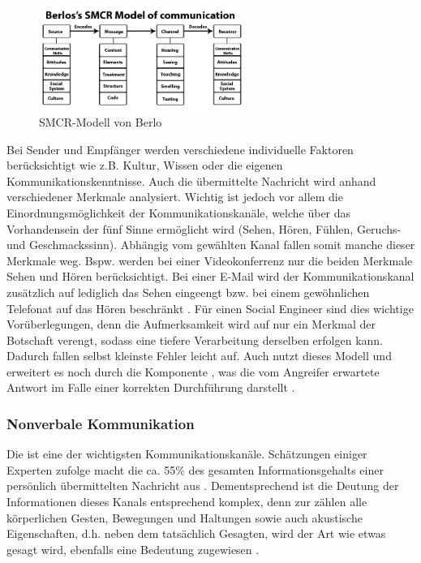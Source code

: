 \begin{figure}[htbp]
	\centering
	\includegraphics[width=0.6\textwidth]{abb/berlos-smcr-model.jpg}
	\caption{SMCR-Modell von Berlo}
	\label{fig:smcr-model-berlo}
\end{figure}

Bei Sender und Empfänger werden verschiedene individuelle Faktoren berücksichtigt wie z.B. Kultur, Wissen oder die eigenen Kommunikationskenntnisse.
Auch die übermittelte Nachricht wird anhand verschiedener Merkmale analysiert.
Wichtig ist jedoch vor allem die Einordnungsmöglichkeit der Kommunikationskanäle, welche über das Vorhandensein der fünf Sinne ermöglicht wird (Sehen, Hören, Fühlen, Geruchs- und Geschmackssinn).
Abhängig vom gewählten Kanal fallen somit manche dieser Merkmale weg.
Bspw. werden bei einer Videokonferrenz nur die beiden Merkmale Sehen und Hören berücksichtigt.
Bei einer E-Mail wird der Kommunikationskanal zusätzlich auf lediglich das Sehen eingeengt bzw. bei einem gewöhnlichen Telefonat auf das Hören beschränkt \citep{human-hacking}.
Für einen Social Engineer sind dies wichtige Vorüberlegungen, denn die Aufmerksamkeit wird auf nur ein Merkmal der Botschaft verengt, sodass eine tiefere Verarbeitung derselben erfolgen kann.
Dadurch fallen selbst kleinste Fehler leicht auf.
Auch  nutzt dieses Modell und erweitert es noch durch die Komponente , was die vom Angreifer erwartete Antwort im Falle einer korrekten Durchführung darstellt \citep{human-hacking}.

\subsubsection{Nonverbale Kommunikation}\label{sec:nonverbale-kommunikation}

Die  ist eine der wichtigsten Kommunikationskanäle.
Schätzungen einiger Experten zufolge macht die  ca. 55\% des gesamten Informationsgehalts einer persönlich übermittelten Nachricht aus \citep[S. 4]{tu-dresden}.
Dementsprechend ist die Deutung der Informationen dieses Kanals entsprechend komplex, denn zur  zählen alle körperlichen Gesten, Bewegungen und Haltungen sowie auch akustische Eigenschaften, d.h. neben dem tatsächlich Gesagten, wird der Art wie etwas gesagt wird, ebenfalls eine Bedeutung zugewiesen \citep{hadnagy}.

